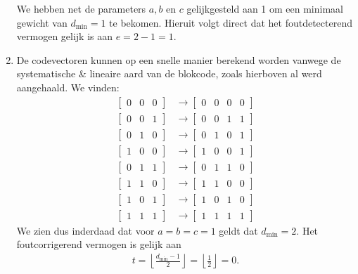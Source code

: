\documentclass[kulak]{kulakarticle}
\begin{document}
\begin{enumerate}
		We hebben net de parameters \(a,b\) en \(c\) gelijkgesteld aan 1 om een minimaal gewicht van \(d_{\min}=1\) te bekomen. Hieruit volgt direct dat het foutdetecterend vermogen gelijk is aan \(e=2-1=1\).

		\item De codevectoren kunnen op een snelle manier berekend worden vanwege de systematische \& lineaire aard van de blokcode, zoals hierboven al werd aangehaald. We vinden: \begin{align*}
			\begin{bmatrix} 0 & 0 & 0 \end{bmatrix} & \rightarrow \begin{bmatrix} 0 & 0 & 0 & 0 \end{bmatrix} \\
			\begin{bmatrix} 0 & 0 & 1 \end{bmatrix} & \rightarrow \begin{bmatrix} 0 & 0 & 1 & 1 \end{bmatrix} \\
			\begin{bmatrix} 0 & 1 & 0 \end{bmatrix} & \rightarrow \begin{bmatrix} 0 & 1 & 0 & 1 \end{bmatrix} \\
			\begin{bmatrix} 1 & 0 & 0 \end{bmatrix} & \rightarrow \begin{bmatrix} 1 & 0 & 0 & 1 \end{bmatrix} \\
			\begin{bmatrix} 0 & 1 & 1 \end{bmatrix} & \rightarrow \begin{bmatrix} 0 & 1 & 1 & 0 \end{bmatrix} \\
			\begin{bmatrix} 1 & 1 & 0 \end{bmatrix} & \rightarrow \begin{bmatrix} 1 & 1 & 0 & 0 \end{bmatrix} \\
			\begin{bmatrix} 1 & 0 & 1 \end{bmatrix} & \rightarrow \begin{bmatrix} 1 & 0 & 1 & 0 \end{bmatrix} \\
			\begin{bmatrix} 1 & 1 & 1 \end{bmatrix} & \rightarrow \begin{bmatrix} 1 & 1 & 1 & 1 \end{bmatrix}
		\end{align*}
		We zien dus inderdaad dat voor \(a=b=c=1\) geldt dat \(d_{\min}=2\). Het foutcorrigerend vermogen is gelijk aan \begin{align*}
			t = \left\lfloor \frac{d_{\min}-1}{2} \right\rfloor = \left\lfloor \frac{1}{2} \right\rfloor = 0.
		\end{align*}


\end{enumerate}
\end{document}

